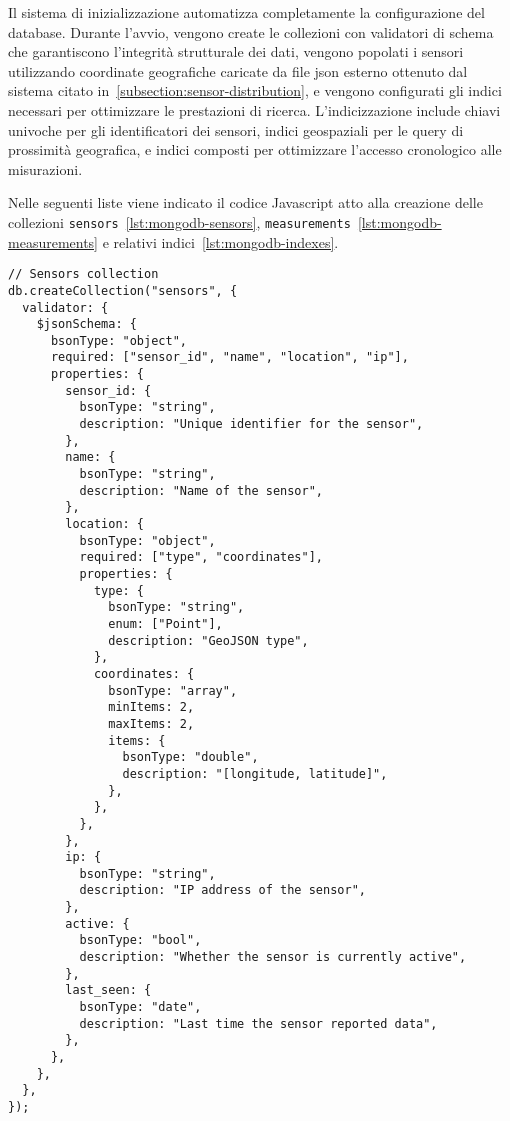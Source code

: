 Il sistema di inizializzazione automatizza completamente la configurazione del database.
Durante l'avvio, vengono create le collezioni con validatori di schema che garantiscono l'integrità
strutturale dei dati, vengono popolati i sensori utilizzando coordinate geografiche caricate
da file \acrshort{json} esterno ottenuto dal sistema citato in~\ref{subsection:sensor-distribution}, e vengono
configurati gli indici necessari per ottimizzare le prestazioni di ricerca. L'indicizzazione include chiavi univoche
per gli identificatori dei sensori, indici geospaziali per le query di prossimità geografica, e indici composti
per ottimizzare l'accesso cronologico alle misurazioni.

Nelle seguenti liste viene indicato il codice Javascript atto alla creazione delle collezioni
\texttt{sensors}~\ref{lst:mongodb-sensors}, \texttt{measurements}~\ref{lst:mongodb-measurements} e relativi
indici~\ref{lst:mongodb-indexes}.

\begin{lstlisting}[caption={Generazione collezione \texttt{sensors} MongoDB}, label=lst:mongodb-sensors]
// Sensors collection
db.createCollection("sensors", {
  validator: {
    $jsonSchema: {
      bsonType: "object",
      required: ["sensor_id", "name", "location", "ip"],
      properties: {
        sensor_id: {
          bsonType: "string",
          description: "Unique identifier for the sensor",
        },
        name: {
          bsonType: "string",
          description: "Name of the sensor",
        },
        location: {
          bsonType: "object",
          required: ["type", "coordinates"],
          properties: {
            type: {
              bsonType: "string",
              enum: ["Point"],
              description: "GeoJSON type",
            },
            coordinates: {
              bsonType: "array",
              minItems: 2,
              maxItems: 2,
              items: {
                bsonType: "double",
                description: "[longitude, latitude]",
              },
            },
          },
        },
        ip: {
          bsonType: "string",
          description: "IP address of the sensor",
        },
        active: {
          bsonType: "bool",
          description: "Whether the sensor is currently active",
        },
        last_seen: {
          bsonType: "date",
          description: "Last time the sensor reported data",
        },
      },
    },
  },
});
\end{lstlisting}

